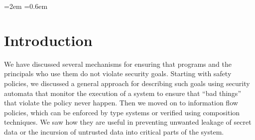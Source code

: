 \documentclass[11pt,twoside]{scrartcl}
\begin{document}
\newcommand{\atrace}{\omega}%
\newcommand{\stdI}{\dTLint[state=\omega]}%
\newcommand{\Ip}{\dTLint[trace=\atrace]}%
\newcommand{\ws}{\omega}\newcommand{\wt}{\nu}%

\newcommand{\aff}[2]{\ensuremath{#1~\keywordfont{aff}~#2}}
\newcommand{\ownsr}{\ensuremath{\keywordfont{owns}}}
\newcommand{\isfac}{\ensuremath{\keywordfont{isFaculty}}}
\newcommand{\studof}{\ensuremath{\keywordfont{studentOf}}}
\newcommand{\canopen}{\ensuremath{\keywordfont{canOpen}}}
\newcommand{\matt}{\ensuremath{\keywordfont{mfredrik}}\xspace}
\newcommand{\tli}{\ensuremath{\keywordfont{alice}}\xspace}
\newcommand{\admin}{\ensuremath{\keywordfont{admin}}\xspace}
\newcommand{\office}{\ensuremath{\keywordfont{cic2126}}\xspace}

\newdimen{\linferenceRulehskipamount}
\linferenceRulehskipamount=2em
  \linferenceRulevskipamount=0.6em


\lstset{escapechar=@,style=customc}

\maketitle
\thispagestyle{empty}


\section{Introduction}

We have discussed several mechanisms for ensuring that programs and the principals who use them do not violate security goals. Starting with safety policies, we discussed a general approach for describing such goals using security automata that monitor the execution of a system to ensure that ``bad things'' that violate the policy never happen. 
Then we moved on to information flow policies, which can be enforced by type systems or verified using composition techniques. We saw how they are useful in preventing unwanted leakage of secret data or the incursion of untrusted data into critical parts of the system.
\end{document}
